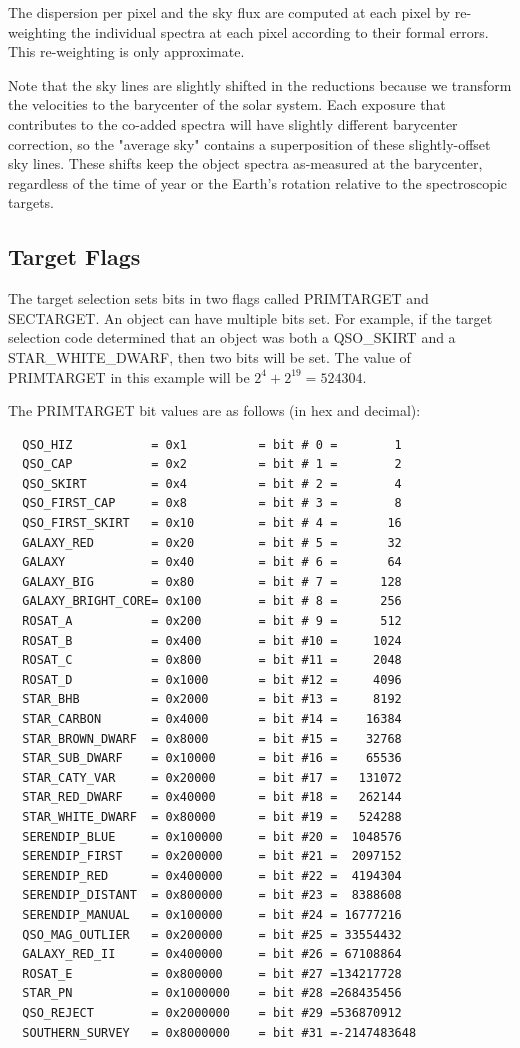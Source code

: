 \documentclass[12pt,preprint]{aastex}
\begin{document}
The dispersion per pixel and the sky flux are computed at each pixel
by re-weighting the individual spectra at each pixel according to
their formal errors. This re-weighting is only approximate.

Note that the sky lines are slightly shifted in the reductions
because we transform the velocities to the barycenter of the solar
system. Each exposure that contributes to the co-added spectra will
have slightly different barycenter correction, so the "average sky"
contains a superposition of these slightly-offset sky lines. These
shifts keep the object spectra as-measured at the barycenter,
regardless of the time of year or the Earth's rotation relative to
the spectroscopic targets.

\subsection{Target Flags}

The target selection sets bits in two flags called PRIMTARGET and
SECTARGET. An object can have multiple bits set. For example, if
the target selection code determined that an object was both a
QSO\_SKIRT and a STAR\_WHITE\_DWARF, then two bits will be set. The
value of PRIMTARGET in this example will be $2^4 + 2^{19} = 524304$.

The PRIMTARGET bit values are as follows (in hex and decimal):
\begin{verbatim}
  QSO_HIZ           = 0x1          = bit # 0 =        1
  QSO_CAP           = 0x2          = bit # 1 =        2
  QSO_SKIRT         = 0x4          = bit # 2 =        4
  QSO_FIRST_CAP     = 0x8          = bit # 3 =        8
  QSO_FIRST_SKIRT   = 0x10         = bit # 4 =       16
  GALAXY_RED        = 0x20         = bit # 5 =       32
  GALAXY            = 0x40         = bit # 6 =       64
  GALAXY_BIG        = 0x80         = bit # 7 =      128
  GALAXY_BRIGHT_CORE= 0x100        = bit # 8 =      256
  ROSAT_A           = 0x200        = bit # 9 =      512
  ROSAT_B           = 0x400        = bit #10 =     1024
  ROSAT_C           = 0x800        = bit #11 =     2048
  ROSAT_D           = 0x1000       = bit #12 =     4096
  STAR_BHB          = 0x2000       = bit #13 =     8192
  STAR_CARBON       = 0x4000       = bit #14 =    16384
  STAR_BROWN_DWARF  = 0x8000       = bit #15 =    32768
  STAR_SUB_DWARF    = 0x10000      = bit #16 =    65536
  STAR_CATY_VAR     = 0x20000      = bit #17 =   131072
  STAR_RED_DWARF    = 0x40000      = bit #18 =   262144
  STAR_WHITE_DWARF  = 0x80000      = bit #19 =   524288
  SERENDIP_BLUE     = 0x100000     = bit #20 =  1048576
  SERENDIP_FIRST    = 0x200000     = bit #21 =  2097152
  SERENDIP_RED      = 0x400000     = bit #22 =  4194304
  SERENDIP_DISTANT  = 0x800000     = bit #23 =  8388608
  SERENDIP_MANUAL   = 0x100000     = bit #24 = 16777216
  QSO_MAG_OUTLIER   = 0x200000     = bit #25 = 33554432
  GALAXY_RED_II     = 0x400000     = bit #26 = 67108864
  ROSAT_E           = 0x800000     = bit #27 =134217728
  STAR_PN           = 0x1000000    = bit #28 =268435456
  QSO_REJECT        = 0x2000000    = bit #29 =536870912
  SOUTHERN_SURVEY   = 0x8000000    = bit #31 =-2147483648
\end{verbatim}
\end{document}
